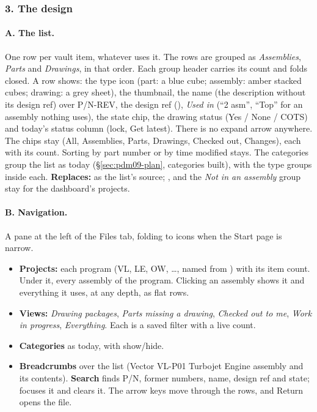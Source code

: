 \subsubsection*{3. The design}

\paragraph{A. The list.} One row per vault item, whatever uses it. The rows are grouped as \emph{Assemblies},
\emph{Parts} and \emph{Drawings}, in that order. Each group header carries its count and folds closed. A row shows:
the type icon (part: a blue cube; assembly: amber stacked cubes; drawing: a grey sheet), the thumbnail, the name
(the description without its design ref) over P/N-REV, the design ref (), \emph{Used in} (``2 asm'',
``Top'' for an assembly nothing uses), the state chip, the drawing status (Yes / None / COTS) and today's status
column (lock, Get latest). There is no expand arrow anywhere. The chips stay (All, Assemblies, Parts, Drawings,
Checked out, Changes), each with its count. Sorting by part number or by time modified stays. The categories group
the list as today (\S\ref{sec:pdm09-plan}, categories built), with the type groups inside each.
\textbf{Replaces:}  as the list's source; ,  and the
\emph{Not in an assembly} group stay for the dashboard's projects.

\paragraph{B. Navigation.} A pane at the left of the Files tab, folding to icons when the Start page is narrow.
\begin{itemize}[nosep]
  \item \textbf{Projects:} each program (VL, LE, OW, \ldots, named from ) with its item count.
        Under it, every assembly of the program. Clicking an assembly shows it and everything it uses, at any depth,
        as flat rows.
  \item \textbf{Views:} \emph{Drawing packages}, \emph{Parts missing a drawing}, \emph{Checked out to me},
        \emph{Work in progress}, \emph{Everything}. Each is a saved filter with a live count.
  \item \textbf{Categories} as today, with show/hide.
  \item \textbf{Breadcrumbs} over the list (Vector \textrangle{} VL-P01 Turbojet \textrangle{} Engine assembly and
        its contents). \textbf{Search} finds P/N, former numbers, name, design ref and state; \code{/} focuses it and
         clears it. The arrow keys move through the rows, and Return opens the file.
\end{itemize}

